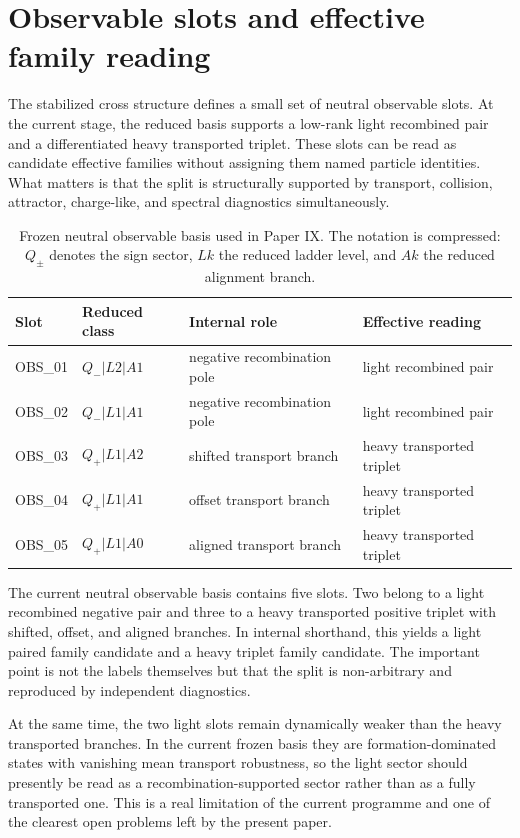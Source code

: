 \documentclass[aps,prd,onecolumn,nofootinbib,superscriptaddress]{revtex4-2}
\begin{document}
\section{Observable slots and effective family reading}
The stabilized cross structure defines a small set of neutral observable slots.
At the current stage, the reduced basis supports a low-rank light recombined pair and a differentiated heavy transported triplet.
These slots can be read as candidate effective families without assigning them named particle identities.
What matters is that the split is structurally supported by transport, collision, attractor, charge-like, and spectral diagnostics simultaneously.

\begin{table}[t]
  \centering
  \begin{tabular}{llll}
    \toprule
    Slot & Reduced class & Internal role & Effective reading \\
    \midrule
    OBS\_01 & $Q_{-}|L2|A1$ & negative recombination pole & light recombined pair \\
    OBS\_02 & $Q_{-}|L1|A1$ & negative recombination pole & light recombined pair \\
    OBS\_03 & $Q_{+}|L1|A2$ & shifted transport branch & heavy transported triplet \\
    OBS\_04 & $Q_{+}|L1|A1$ & offset transport branch & heavy transported triplet \\
    OBS\_05 & $Q_{+}|L1|A0$ & aligned transport branch & heavy transported triplet \\
    \bottomrule
  \end{tabular}
  \caption{Frozen neutral observable basis used in Paper IX. The notation is compressed: $Q_{\pm}$ denotes the sign sector, $Lk$ the reduced ladder level, and $Ak$ the reduced alignment branch.}
  \label{tab:paper09-observable-slots}
\end{table}

The current neutral observable basis contains five slots.
Two belong to a light recombined negative pair and three to a heavy transported positive triplet with shifted, offset, and aligned branches.
In internal shorthand, this yields a light paired family candidate and a heavy triplet family candidate.
The important point is not the labels themselves but that the split is non-arbitrary and reproduced by independent diagnostics.

At the same time, the two light slots remain dynamically weaker than the heavy transported branches.
In the current frozen basis they are formation-dominated states with vanishing mean transport robustness, so the light sector should presently be read as a recombination-supported sector rather than as a fully transported one.
This is a real limitation of the current programme and one of the clearest open problems left by the present paper.
\end{document}

